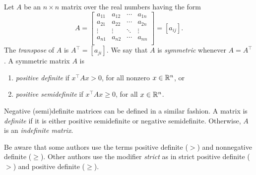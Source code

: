 Let \(A\) be an \(n \times n\) matrix over the real numbers having the form
\begin{equation}
    A = \begin{bmatrix}
        a_{11} & a_{12} & \cdots & a_{1n}\\
        a_{21} & a_{22} & \cdots & a_{2n}\\
        \vdots & \vdots & \ddots & \vdots\\
        a_{n1} & a_{n2} & \cdots & a_{nn}\\
    \end{bmatrix} = [a_{ij}].
\end{equation}
The \textit{transpose} of \(A\) is \(A^\top = [a_{ji}]\).
We say that \(A\) is \textit{symmetric} whenever \(A = A^\top\).
A symmetric matrix \(A\) is
\begin{enumerate}
    \item \label{part:positive-definite-matrix}
    \textit{positive definite} if \(x^\top A x > 0\), for all nonzero \(x \in \mathbb{R}^n\), or
    \item \label{part:positive-semidefinite-matrix}
    \textit{positive semidefinite} if \(x^\top A x \geq 0\), for all \(x \in \mathbb{R}^n\).
\end{enumerate} 
Negative (semi)definite matrices can be defined in a similar fashion.
A matrix is \textit{definite} if it is either positive semidefinite or negative semidefinite.
Otherwise, \(A\) is an \textit{indefinite matrix}.

Be aware that some authors use the terms positive definite (\(>\)) and nonnegative definite (\(\geq\)).
Other authors use the modifier \textit{strict} as in strict positive definite (\(>\)) and positive definite (\(\geq\)).